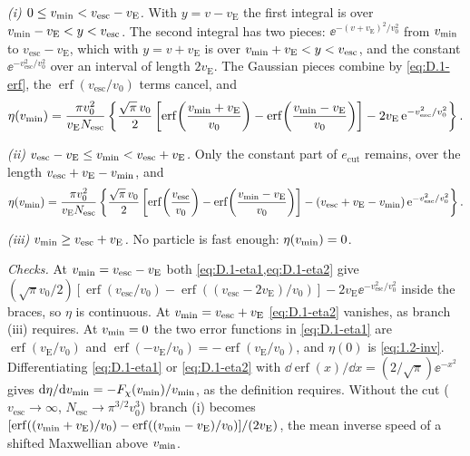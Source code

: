 \emph{(i) $0 \le v_{\mathrm{min}} < v_{\mathrm{esc}} - v_{\mathrm{E}}$.} With $y = v - v_{\mathrm{E}}$ the first integral is over $v_{\mathrm{min}} - v_{\mathrm{E}} < y < v_{\mathrm{esc}}$. The second integral has two pieces: $\ee^{-(v + v_{\mathrm{E}})^2/v_0^2}$ from $v_{\mathrm{min}}$ to $v_{\mathrm{esc}} - v_{\mathrm{E}}$, which with $y = v + v_{\mathrm{E}}$ is over $v_{\mathrm{min}} + v_{\mathrm{E}} < y < v_{\mathrm{esc}}$, and the constant $\ee^{-v_{\mathrm{esc}}^2/v_0^2}$ over an interval of length $2v_{\mathrm{E}}$. The Gaussian pieces combine by \cref{eq:D.1-erf}, the $\operatorname{erf}(v_{\mathrm{esc}}/v_0)$ terms cancel, and
\begin{equation}
  \eta(v_{\mathrm{min}}) = \frac{\pi v_0^2}{v_{\mathrm{E}}N_{\mathrm{esc}}}\left\{\frac{\sqrt{\pi}\,v_0}{2}\left[\operatorname{erf}\!\left(\frac{v_{\mathrm{min}} + v_{\mathrm{E}}}{v_0}\right) - \operatorname{erf}\!\left(\frac{v_{\mathrm{min}} - v_{\mathrm{E}}}{v_0}\right)\right] - 2v_{\mathrm{E}}\,\mathrm{e}^{-v_{\mathrm{esc}}^2/v_0^2}\right\}.
  \label{eq:D.1-eta1}
\end{equation}

\emph{(ii) $v_{\mathrm{esc}} - v_{\mathrm{E}} \le v_{\mathrm{min}} < v_{\mathrm{esc}} + v_{\mathrm{E}}$.} Only the constant part of $e_{\mathrm{cut}}$ remains, over the length $v_{\mathrm{esc}} + v_{\mathrm{E}} - v_{\mathrm{min}}$, and
\begin{equation}
  \eta(v_{\mathrm{min}}) = \frac{\pi v_0^2}{v_{\mathrm{E}}N_{\mathrm{esc}}}\left\{\frac{\sqrt{\pi}\,v_0}{2}\left[\operatorname{erf}\!\left(\frac{v_{\mathrm{esc}}}{v_0}\right) - \operatorname{erf}\!\left(\frac{v_{\mathrm{min}} - v_{\mathrm{E}}}{v_0}\right)\right] - (v_{\mathrm{esc}} + v_{\mathrm{E}} - v_{\mathrm{min}})\,\mathrm{e}^{-v_{\mathrm{esc}}^2/v_0^2}\right\}.
  \label{eq:D.1-eta2}
\end{equation}

\emph{(iii) $v_{\mathrm{min}} \ge v_{\mathrm{esc}} + v_{\mathrm{E}}$.} No particle is fast enough: $\eta(v_{\mathrm{min}}) = 0$.

\emph{Checks.} At $v_{\mathrm{min}} = v_{\mathrm{esc}} - v_{\mathrm{E}}$ both \cref{eq:D.1-eta1,eq:D.1-eta2} give $(\sqrt{\pi}v_0/2)[\operatorname{erf}(v_{\mathrm{esc}}/v_0) - \operatorname{erf}((v_{\mathrm{esc}} - 2v_{\mathrm{E}})/v_0)] - 2v_{\mathrm{E}}\ee^{-v_{\mathrm{esc}}^2/v_0^2}$ inside the braces, so $\eta$ is continuous. At $v_{\mathrm{min}} = v_{\mathrm{esc}} + v_{\mathrm{E}}$ \cref{eq:D.1-eta2} vanishes, as branch (iii) requires. At $v_{\mathrm{min}} = 0$ the two error functions in \cref{eq:D.1-eta1} are $\operatorname{erf}(v_{\mathrm{E}}/v_0)$ and $\operatorname{erf}(-v_{\mathrm{E}}/v_0) = -\operatorname{erf}(v_{\mathrm{E}}/v_0)$, and $\eta(0)$ is \cref{eq:1.2-inv}. Differentiating \cref{eq:D.1-eta1} or \cref{eq:D.1-eta2} with $\dd\operatorname{erf}(x)/\dd x = (2/\sqrt{\pi})\ee^{-x^2}$ gives $\mathrm{d}\eta/\mathrm{d}v_{\mathrm{min}} = -F_\chi(v_{\mathrm{min}})/v_{\mathrm{min}}$, as the definition requires. Without the cut ($v_{\mathrm{esc}}\to\infty$, $N_{\mathrm{esc}}\to\pi^{3/2}v_0^3$) branch (i) becomes $[\operatorname{erf}((v_{\mathrm{min}} + v_{\mathrm{E}})/v_0) - \operatorname{erf}((v_{\mathrm{min}} - v_{\mathrm{E}})/v_0)]/(2v_{\mathrm{E}})$, the mean inverse speed of a shifted Maxwellian above $v_{\mathrm{min}}$.

